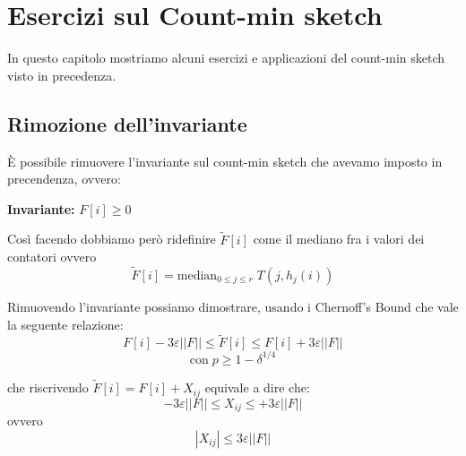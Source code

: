 \documentclass[a4paper,11pt]{book}
\begin{document}
\chapter{Esercizi sul Count-min sketch}

In questo capitolo mostriamo alcuni esercizi e applicazioni del count-min sketch visto in precedenza.

\section{Rimozione dell'invariante}

\`E possibile rimuovere l'invariante sul count-min sketch che avevamo imposto in precendenza, ovvero: 

\textbf{Invariante:} $F[i] \geq 0$

Cos\`i facendo dobbiamo per\`o ridefinire $\tilde{F}[i]$ come il mediano fra i valori dei contatori ovvero $$\tilde{F}[i] = \mbox{median}_{0 \leq j \leq r} \; T(j, h_j (i))$$

Rimuovendo l'invariante possiamo dimostrare, usando i Chernoff's Bound che vale la seguente relazione: $$F[i] - 3\varepsilon||F|| \leq \tilde{F}[i] \leq F[i] + 3\varepsilon||F||$$
$$ \mbox{con} \; p \geq 1 - \delta^{1/4}$$

che riscrivendo $\tilde{F}[i] = F[i] + X_{ij}$ equivale a dire che:
$$- 3\varepsilon||F|| \leq X_{ij} \leq + 3\varepsilon||F||$$
ovvero
$$ |X_{ij}| \leq 3 \varepsilon ||F||$$
\end{document}
